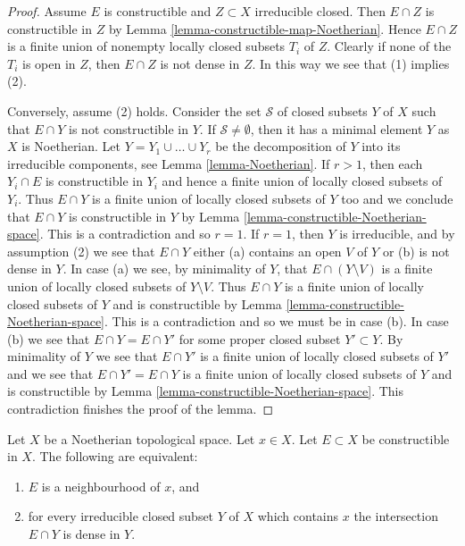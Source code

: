 \begin{proof}
Assume $E$ is constructible and $Z \subset X$ irreducible closed.
Then $E \cap Z$ is constructible in $Z$ by
Lemma \ref{lemma-constructible-map-Noetherian}.
Hence $E \cap Z$ is a finite union of nonempty locally closed subsets
$T_i$ of $Z$. Clearly if none of the $T_i$ is open in $Z$, then
$E \cap Z$ is not dense in $Z$. In this way we see that (1) implies (2).

\medskip\noindent
Conversely, assume (2) holds. Consider the set $\mathcal{S}$ of closed
subsets $Y$ of $X$ such that $E \cap Y$ is not constructible in $Y$.
If $\mathcal{S} \not = \emptyset$, then it has a minimal element $Y$
as $X$ is Noetherian.
Let $Y = Y_1 \cup \ldots \cup Y_r$ be the decomposition of $Y$ into its
irreducible components, see
Lemma \ref{lemma-Noetherian}.
If $r > 1$, then each $Y_i \cap E$ is constructible in $Y_i$ and hence
a finite union of locally closed subsets of $Y_i$. Thus $E \cap Y$
is a finite union of locally closed subsets of $Y$ too and we conclude
that $E \cap Y$ is constructible in $Y$ by
Lemma \ref{lemma-constructible-Noetherian-space}.
This is a contradiction and so $r = 1$. If $r = 1$, then $Y$ is
irreducible, and by assumption (2) we see that $E \cap Y$ either
(a) contains an open $V$ of $Y$ or (b) is not dense in $Y$.
In case (a) we see, by minimality of $Y$, that $E \cap (Y \setminus V)$
is a finite union of locally closed subsets of $Y \setminus V$. Thus
$E \cap Y$ is a finite union of locally closed subsets of $Y$ and is
constructible by
Lemma \ref{lemma-constructible-Noetherian-space}.
This is a contradiction and so we must be in case (b).
In case (b) we see that $E \cap Y = E \cap Y'$ for some proper closed
subset $Y' \subset Y$. By minimality of $Y$ we see that
$E \cap Y'$ is a finite union of locally closed subsets of $Y'$ and
we see that $E \cap Y' = E \cap Y$ is a finite union of locally closed
subsets of $Y$ and is constructible by
Lemma \ref{lemma-constructible-Noetherian-space}.
This contradiction finishes the proof of the lemma.
\end{proof}

\begin{lemma}
\label{lemma-constructible-neighbourhood-Noetherian}
Let $X$ be a Noetherian topological space.
Let $x \in X$.
Let $E \subset X$ be constructible in $X$.
The following are equivalent:
\begin{enumerate}
\item $E$ is a neighbourhood of $x$, and
\item for every irreducible closed subset $Y$ of $X$ which contains
$x$ the intersection $E \cap Y$ is dense in $Y$.
\end{enumerate}
\end{lemma}

